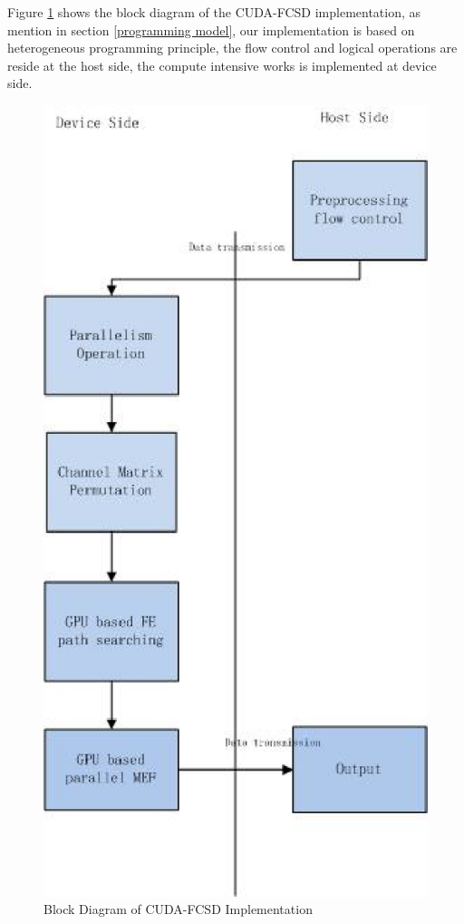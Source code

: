 \documentclass[12pt,a4paper,final]{article}
\begin{document}
\begin{spacing}{2.5}
Figure \ref{block diagram} shows the block diagram of the CUDA-FCSD implementation, as mention in section \ref{programming model}, our implementation is based on heterogeneous programming principle, the flow control and logical operations are reside at the host side, the compute intensive works is implemented at device side.
\begin{figure}[htb]
\centering
\includegraphics[scale=0.8]{CUDA_FCSD_block_diagram.eps}
\caption{Block Diagram of CUDA-FCSD Implementation}
\label{block diagram}
\end{figure}

\end{spacing}
\end{document}
